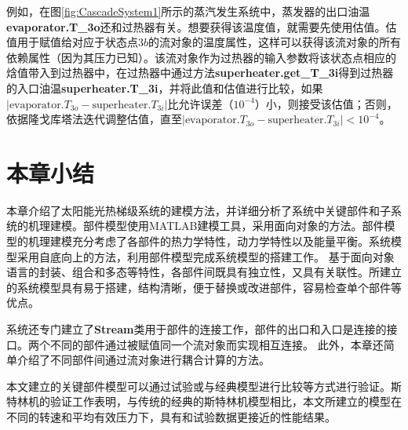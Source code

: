 例如，在图\ref{fig:CascadeSystem1}所示的蒸汽发生系统中，蒸发器的出口油温\textbf{evaporator.T\_3o}还和过热器有关。想要获得该温度值，就需要先使用估值。估值用于赋值给对应于状态点$3b$的流对象的温度属性，这样可以获得该流对象的所有依赖属性（因为其压力已知）。该流对象作为过热器的输入参数将该状态点相应的焓值带入到过热器中，在过热器中通过方法\textbf{superheater.get\_T\_3i}得到过热器的入口油温\textbf{superheater.T\_3i}，并将此值和估值进行比较，如果$\left|\mathrm{evaporator}.T_{3o} - \mathrm{superheater}.T_{3i}\right|$比允许误差（$10^{-4}$）小，则接受该估值；否则，依据隆戈库塔法迭代调整估值，直至$\left|\mathrm{evaporator}.T_{3o} - \mathrm{superheater}.T_{3i}\right| < 10^{-4}$。

\section{本章小结}

本章介绍了太阳能光热梯级系统的建模方法，并详细分析了系统中关键部件和子系统的机理建模。部件模型使用MATLAB建模工具，采用面向对象的方法。部件模型的机理建模充分考虑了各部件的热力学特性，动力学特性以及能量平衡。系统模型采用自底向上的方法，利用部件模型完成系统模型的搭建工作。
基于面向对象语言的封装、组合和多态等特性，各部件间既具有独立性，又具有关联性。所建立的系统模型具有易于搭建，结构清晰，便于替换或改进部件，容易检查单个部件等优点。

系统还专门建立了\textbf{Stream}类用于部件的连接工作，部件的出口和入口是连接的接口。两个不同的部件通过被赋值同一个流对象而实现相互连接。
此外，本章还简单介绍了不同部件间通过流对象进行耦合计算的方法。

本文建立的关键部件模型可以通过试验或与经典模型进行比较等方式进行验证。斯特林机的验证工作表明，与传统的经典的斯特林机模型相比，本文所建立的模型在不同的转速和平均有效压力下，具有和试验数据更接近的性能结果。